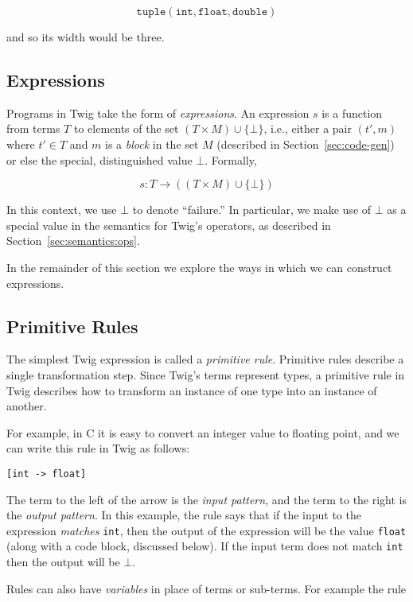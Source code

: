 \[
\mathtt{tuple(int,float,double)}
\]

and so its width would be three.

\subsection{Expressions}

Programs in Twig take the form of \emph{expressions}. An expression $s$ is a function from terms $T$ to elements of the set $(T \times M) \cup \{\bot\}$, i.e., either a pair $(t',m)$ where $t' \in T$ and $m$ is a \emph{block} in the set $M$ (described in Section~\ref{sec:code-gen}) or else the special, distinguished value $\bot$. Formally, 

\[
s : T \to ((T \times M) \cup \{\bot\})
\]

In this context, we use $\bot$ to denote ``failure.'' In particular, we make use of $\bot$ as a special value in the semantics for Twig's operators, as described in Section~\ref{sec:semantics:ops}.

In the remainder of this section we explore the ways in which we can construct expressions.

\subsection{Primitive Rules}

The simplest Twig expression is called a \emph{primitive rule}.  Primitive rules describe a single transformation step. Since Twig's terms represent types, a primitive rule in Twig describes how to transform an instance of one type into an instance of another.

For example, in C it is easy to convert an integer value to floating point, and we can write this rule in Twig as follows:

\begin{verbatim}
[int -> float]
\end{verbatim}

The term to the left of the arrow is the \emph{input pattern}, and the term to the right is the \emph{output pattern}. In this example, the rule says that if the input to the expression \emph{matches} \texttt{int}, then the output of the expression will be the value \texttt{float} (along with a code block, discussed below). If the input term does not match \texttt{int} then the output will be $\bot$.

Rules can also have \emph{variables} in place of terms or sub-terms. For example the rule

